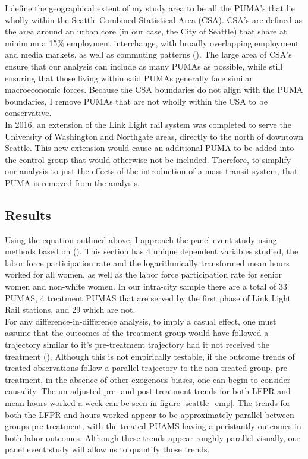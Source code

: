 \documentclass[A4paper,12pt]{article}
\begin{document}
I define the geographical extent of my study area to be all the PUMA's that lie wholly within the Seattle Combined Statistical Area (CSA). CSA's are defined as the area around an urban core (in our case, the City of Seattle) that share at minimum a 15\% employment interchange, with broadly overlapping employment and media markets, as well as commuting patterns (\cite{united_states_office_of_management_and_budget_omb_2020}). The large area of CSA's ensure that our analysis can include as many PUMAs as possible, while still ensuring that those living within said PUMAs generally face similar macroeconomic forces. Because the CSA boundaries do not align with the PUMA boundaries, I remove PUMAs that are not wholly within the CSA to be conservative. \\

In 2016, an extension of the Link Light rail system was completed to serve the University of Washington and Northgate areas, directly to the north of downtown Seattle. This new extension would cause an additional PUMA to be added into the control group that would otherwise not be included. Therefore, to simplify our analysis to just the effects of the introduction of a mass transit system, that PUMA is removed from the analysis. \\

\subsection{Results}

Using the equation outlined above, I approach the panel event study using methods based on \citeauthor{clarke_implementing_2020} (\citeyear{clarke_implementing_2020}). This section has 4 unique dependent variables studied, the labor force participation rate and the logarithmically transformed mean hours worked for all women, as well as the labor force participation rate for senior women and non-white women. In our intra-city sample there are a total of 33 PUMAS, 4 treatment PUMAS that are served by the first phase of Link Light Rail stations, and 29 which are not. \\

For any difference-in-difference analysis, to imply a casual effect, one must assume that the outcomes of the treatment group would have followed a trajectory similar to it's pre-treatment trajectory had it not received the treatment (\cite{venkataramani_association_2020}). Although this is not empirically testable, if the outcome trends of treated observations follow a parallel trajectory to the non-treated group, pre-treatment, in the absence of other exogenous biases, one can begin to consider causality. The un-adjusted pre- and post-treatment trends for both LFPR and mean hours worked a week can be seen in figure \ref{seattle_emp}. The trends for both the LFPR and hours worked appear to be approximately parallel between groups pre-treatment, with the treated PUAMS having a peristantly outcomes in both labor outcomes. Although these trends appear roughly parallel visually, our panel event study will allow us to quantify those trends. \\
\end{document}
